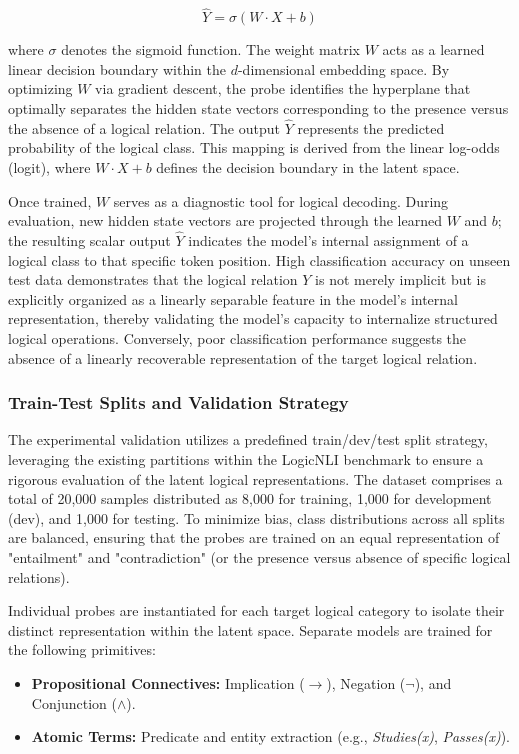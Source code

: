 \documentclass[12 pt]{article}  %
\begin{document}
$$\hat{Y} = \sigma(W \cdot X + b)$$

where $\sigma$ denotes the sigmoid function. The weight matrix $W$ acts as a 
learned linear decision boundary within the $d$-dimensional embedding space. 
By optimizing $W$ via gradient descent, the probe identifies the hyperplane 
that optimally separates the hidden state vectors corresponding to the presence 
versus the absence of a logical relation. The output $\hat{Y}$ represents the 
predicted probability of the logical class. This mapping is derived from the 
linear log-odds (logit), where $W \cdot X + b$ defines the decision boundary in 
the latent space.

Once trained, $W$ serves as a diagnostic tool for logical decoding. During 
evaluation, new hidden state vectors are projected through the learned $W$ and 
$b$; the resulting scalar output $\hat{Y}$ indicates the model's internal 
assignment of a logical class to that specific token position. High 
classification accuracy on unseen test data demonstrates that the logical 
relation $Y$ is not merely implicit but is explicitly organized as a linearly 
separable feature in the model's internal representation, thereby validating the 
model's capacity to internalize structured logical operations. Conversely, poor 
classification performance suggests the absence of a linearly recoverable 
representation of the target logical relation.

\subsubsection{Train-Test Splits and Validation Strategy}
The experimental validation utilizes a predefined train/dev/test split strategy, 
leveraging the existing partitions within the LogicNLI benchmark to ensure a 
rigorous evaluation of the latent logical representations. The dataset comprises 
a total of 20,000 samples distributed as 8,000 for training, 1,000 for 
development (dev), and 1,000 for testing. To minimize bias, class distributions 
across all splits are balanced, ensuring that the probes are trained on an equal 
representation of "entailment" and "contradiction" (or the presence versus 
absence of specific logical relations).

Individual probes are instantiated for each target logical category to isolate 
their distinct representation within the latent space. Separate models are 
trained for the following primitives:

\begin{itemize}
    \item \textbf{Propositional Connectives:} Implication ($\rightarrow$), Negation ($\neg$), and Conjunction ($\land$).
    \item \textbf{Atomic Terms:} Predicate and entity extraction (e.g., \textit{Studies(x)}, \textit{Passes(x)}).
\end{itemize}
\end{document}
